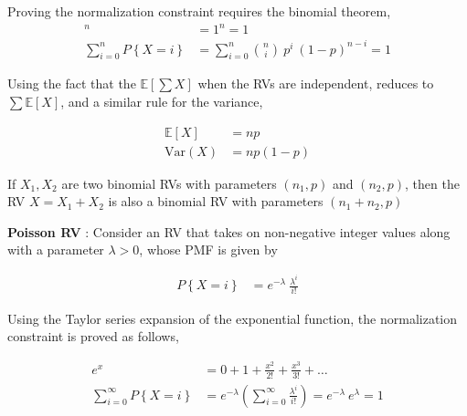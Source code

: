 Proving the normalization constraint requires the binomial theorem,
\begin{align}
	[p + (1-p)]^n &= 1^n = 1 \nonumber \\
	\sum\limits_{i=0}^{n} P \left\{X = i\right\} &= \sum\limits_{i=0}^{n} \binom{n}{i}\ p^i \ (1-p)^{n-i}  = 1
\end{align}

Using the fact that the $ \mathbb{E}[\sum X] $ when the RVs are independent, reduces to $ \sum \mathbb{E}[X] $, and a similar rule for the variance,

\begin{align}
	\mathbb{E}[X] &= np \\
	\mathrm{Var}(X) &= np(1-p)
\end{align}

If $ X_1, X_2 $ are two binomial RVs with parameters $ (n_1, p) $ and $ (n_2, p) $, then the RV $ X = X_1 + X_2 $ is also a binomial RV with parameters $ (n_1 + n_2, p) $ 

\textbf{Poisson RV} : Consider an RV that takes on non-negative integer values along with a parameter $ \lambda > 0 $, whose PMF is given by


\begin{align}
	P \left\{X = i\right\} &= e^{-\lambda}\ \frac{\lambda^i}{i!}
\end{align}

Using the Taylor series expansion of the exponential function, the normalization constraint is proved as follows,


\begin{align}
	e^x &= 0 + 1 + \frac{x^2}{2!} + \frac{x^3}{3!} + \dots \nonumber \\
	\sum\limits_{i=0}^{\infty} P \left\{X = i\right\} &= e^{-\lambda} \left(\sum\limits_{i=0}^{\infty} \frac{\lambda^i}{i!}\right) = e^{-\lambda} \ e^{\lambda} = 1
\end{align}

\begin{figure}[!h]
	\centering
\end{figure}

